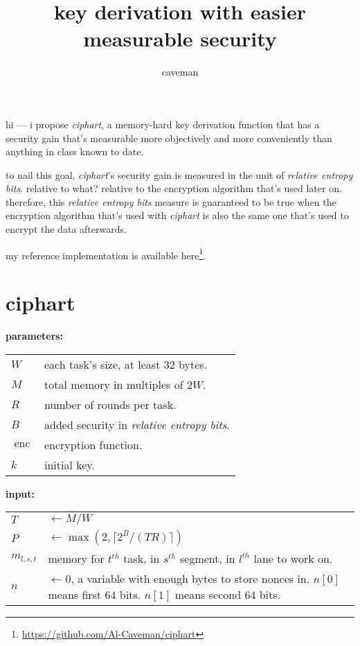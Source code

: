 \documentclass{article}
\author{caveman}
\title{key derivation with easier measurable security}
\DeclareMathOperator{\enc}{enc}
\DeclareMathOperator{\maxf}{max}
\begin{document}
\begin{multicols}{2}
\maketitle

hi --- i propose \emph{ciphart}, a memory-hard key derivation function that
has a security gain that's measurable more objectively and more
conveniently than anything in class known to date.

to nail this goal, \emph{ciphart}'s security gain is measured in the unit
of \emph{relative entropy bits}.  relative to what?  relative to the
encryption algorithm that's used later on.  therefore, this \emph{relative
entropy bits} measure is guaranteed to be true when the encryption
algorithm that's used with \emph{ciphart} is also the same one that's used
to encrypt the data afterwards.

my reference implementation is available
here\footnote{\url{https://github.com/Al-Caveman/ciphart}}.

\tableofcontents
\vfill\null
\columnbreak

\section{ciphart}
\noindent\textbf{parameters:}

\begin{tabular}{lp{18em}}
    $W$ & each task's size, at least $32$ bytes.\\
    $M$ & total memory in multiples of $2W$.\\
    $R$ & number of rounds per task.\\
    $B$ & added security in \emph{relative entropy bits}.\\
    $\enc$ & encryption function.\\
    $k$ & initial key.\\
\end{tabular}

\noindent\textbf{input:}

\begin{tabular}{lp{18em}}
    $T$ & $\gets M/W$\\
    $P$ & $\gets \maxf(2, \lceil2^B / (TR)\rceil)$\\
    $m_{l,s,t}$ & memory for $t^{th}$ task, in $s^{th}$ segment, in
    $l^{th}$ lane to work on.\\
    $n$ & $\gets 0$, a variable with enough bytes to store nonces in.
    $n[0]$ means first $64$ bits.  $n[1]$ means second $64$ bits.\\
\end{tabular}


\end{multicols}
\end{document}
